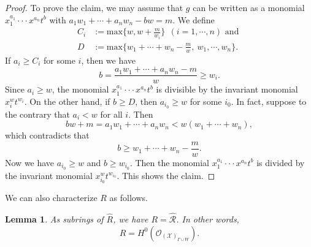 \documentclass[12pt,a4paper]{amsart}
\newtheorem{Lem}[Thm]{Lemma}
\theoremstyle{remark}
\theoremstyle{definition}
\begin{document}
\begin{proof}
To prove the claim, we may assume that $g$ can be written as a monomial $x_1^{a_1}\cdot\cdot\cdot x^{a_n}t^b$ with $a_1w_1 + \cdots  + a_nw_n -bw = m$. We define 
\begin{align}
C_i &:= \mathrm{max}\bigl\{w, w + \frac{m}{w_i}\bigr\}\:\: (i = 1, \cdots , n) \text{ and } \\
D &:= \mathrm{max}\bigl\{w_1 + \cdots  + w_n - \frac{m}{w}, \: w_1, \cdots , w_n\bigr\}.
\end{align}
If $a_i \geq C_i$ for some $i$, then we have
$$b = \frac{a_1w_1 + \cdots  + a_nw_n -m}{w} \geq w_i.$$ Since $a_i \geq w$, the monomial $x_1^{a_1}\cdot\cdot\cdot x^{a_n}t^b$ is divisible by the invariant monomial 
$x_i^wt^{w_i}$.  On the other hand, if $b \geq D$, then $a_{i_0} \geq w$ for some $i_0$. In fact, suppose to the contrary that 
$a_i < w$ for all $i$. Then $$bw + m = a_1w_1 + \cdots  + a_nw_n < w(w_1 + \cdots  + w_n),$$ which contradicts that 
$$b \geq w_1 + \cdots  + w_n - \frac{m}{w}.$$ 
Now we have $a_{i_0} \geq w$ and $b \geq w_{i_0}$. Then the monomial $x_1^{a_1}\cdot\cdot\cdot x^{a_n}t^b$ is divided by the 
invariant monomial $x_{i_0}^wt^{w_{i_0}}$.  This shows the claim.  \end{proof}






\vspace{0.2cm}


 
 

We can also characterize $R$ as follows. 

\begin{Lem}\label{Lem2}  
As subrings of $\hat{R}$, we have $R = \hat{\mathcal R}$. In other words, 
$$R = H^0(\mathcal{O}_{(\mathcal{X})^{\hat{}}_{\Gamma \cup W}}).$$    
\end{Lem}
\end{document}
